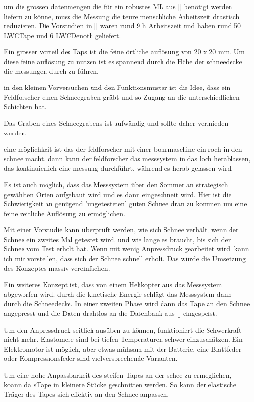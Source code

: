 um die grossen datenmengen die für ein robustes ML aus \ref{} benötigt werden liefern zu könne, muss die Messung die teure menschliche Arbeitszeit drastisch reduzieren. Die Vorstudien in \ref{} waren rund 9 h Arbeitszeit und haben rund 50 LWCTape und 6 LWCDenoth geliefert.


Ein grosser vorteil des Taps ist die feine örtliche auflösung von 20 x 20 mm. Um diese feine auflösung zu nutzen ist es spannend durch die Höhe der schneedecke die messungen durch zu führen.

in den kleinen Vorversuchen und den Funktionsmuster ist die Idee, dass ein Feldforscher einen Schneegraben gräbt und so Zugang an die unterschiedlichen Schichten hat.

Das Graben eines Schneegrabens ist aufwändig und sollte daher vermieden werden.

eine möglichkeit ist das der feldforscher mit einer bohrmaschine ein roch in den schnee macht. dann kann der feldforscher das messsystem in das loch herablassen, das kontinuierlich eine messung durchführt, während es herab gelassen wird.

Es ist auch möglich, dass das Messsystem über den Sommer an strategisch gewählten Orten aufgebaut wird und es dann eingeschneit wird. Hier ist die Schwierigkeit an genügend 'ungetesteten' guten Schnee dran zu kommen um eine feine zeitliche Auflösung zu ermöglichen.

Mit einer Vorstudie kann überprüft werden, wie sich Schnee verhält, wenn der Schnee ein zweites Mal getestet wird, und wie lange es braucht, bis sich der Schnee vom Test erholt hat. Wenn mit wenig Anpressdruck gearbeitet wird, kann ich mir vorstellen, dass sich der Schnee schnell erholt. Das würde die Umsetzung des Konzeptes massiv vereinfachen.

Ein weiteres Konzept ist, dass von einem Helikopter aus das Messsystem abgeworfen wird. durch die kinetische Energie schlägt das Messsystem dann durch die Schneedecke. In einer zweiten Phase wird dann das Tape an den Schnee angepresst und die Daten drahtlos an die Datenbank aus \ref{} eingespeist.

Um den Anpressdruck seitlich ausüben zu können, funktioniert die Schwerkraft nicht mehr. Elastomere sind bei tiefen Temperaturen schwer einzuschätzen. Ein Elektromotor ist möglich, aber etwas mühsam mit der Batterie. eine Blattfeder oder Kompressionsfeder sind vielversprechende Varianten.

Um eine hohe Anpassbarkeit des steifen Tapes an der schee zu ermoglichen, koann da sTape in kleinere Stücke geschnitten werden. So kann der elastische Träger des Tapes sich effektiv an den Schnee anpassen.


